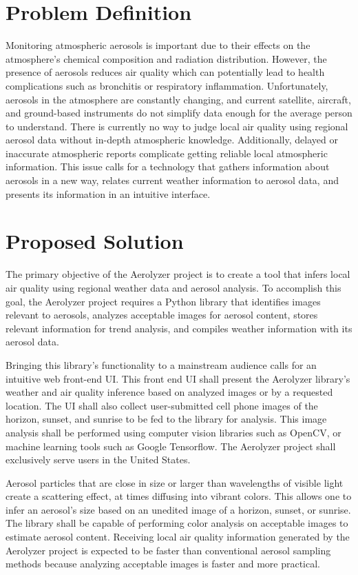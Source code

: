 \documentclass[letterpaper,10pt,draftclsnofoot,onecolumn]{IEEEtran}
\newcommand\tab[1][1cm]{\hspace*{#1}}
\begin{document}
\clearpage
\begin{flushleft}
\section{Problem Definition}
\tab Monitoring atmospheric aerosols is important due to their effects on the atmosphere's chemical composition and radiation distribution. However, the presence of aerosols reduces air quality which can potentially lead to health complications such as bronchitis or respiratory inflammation. Unfortunately, aerosols in the atmosphere are constantly changing, and current satellite, aircraft, and ground-based instruments do not simplify data enough for the average person to understand. There is currently no way to judge local air quality using regional aerosol data without in-depth atmospheric knowledge. Additionally, delayed or inaccurate atmospheric reports complicate getting reliable local atmospheric information. This issue calls for a technology that gathers information about aerosols in a new way, relates current weather information to aerosol data, and presents its information in an intuitive interface.

\section{Proposed Solution}
\tab The primary objective of the Aerolyzer project is to create a tool that infers local air quality using regional weather data and aerosol analysis. To accomplish this goal, the Aerolyzer project requires a Python library that identifies images relevant to aerosols, analyzes acceptable images for aerosol content, stores relevant information for trend analysis, and compiles weather information with its aerosol data. 
\par
\tab Bringing this library's functionality to a mainstream audience calls for an intuitive web front-end UI. This front end UI shall present the Aerolyzer library's weather and air quality inference based on analyzed images or by a requested location. The UI shall also collect user-submitted cell phone images of the horizon, sunset, and sunrise to be fed to the library for analysis. This image analysis shall be performed using computer vision libraries such as OpenCV, or machine learning tools such as Google Tensorflow. The Aerolyzer project shall exclusively serve users in the United States.

\par
\tab Aerosol particles that are close in size or larger than wavelengths of visible light create a scattering effect, at times diffusing into vibrant colors. This allows one to infer an aerosol's size based on an unedited image of a horizon, sunset, or sunrise. The library shall be capable of performing color analysis on acceptable images to estimate aerosol content. Receiving local air quality information generated by the Aerolyzer project is expected to be faster than conventional aerosol sampling methods because analyzing acceptable images is faster and more practical.


\end{flushleft}
\end{document}
